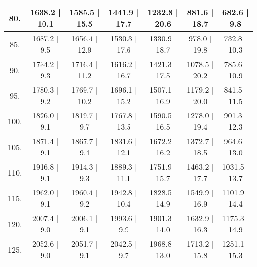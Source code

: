 \begin{tabular}{|c||c|c|c|c|c|c|}
\hline
  80. &   1638.2 |    10.1 &   1585.5 |    15.5 &   1441.9 |    17.7 &   1232.8 |    20.6 &    881.6 |    18.7 &    682.6 |     9.8\tabularnewline
\hline
  85. &   1687.2 |     9.5 &   1656.4 |    12.9 &   1530.3 |    17.6 &   1330.9 |    18.7 &    978.0 |    19.8 &    732.8 |    10.3\tabularnewline
\hline
  90. &   1734.2 |     9.3 &   1716.4 |    11.2 &   1616.2 |    16.7 &   1421.3 |    17.5 &   1078.5 |    20.2 &    785.6 |    10.9\tabularnewline
\hline
  95. &   1780.3 |     9.2 &   1769.7 |    10.2 &   1696.1 |    15.2 &   1507.1 |    16.9 &   1179.2 |    20.0 &    841.5 |    11.5\tabularnewline
\hline
 100. &   1826.0 |     9.1 &   1819.7 |     9.7 &   1767.8 |    13.5 &   1590.5 |    16.5 &   1278.0 |    19.4 &    901.3 |    12.3\tabularnewline
\hline
 105. &   1871.4 |     9.1 &   1867.7 |     9.4 &   1831.6 |    12.1 &   1672.2 |    16.2 &   1372.7 |    18.5 &    964.6 |    13.0\tabularnewline
\hline
 110. &   1916.8 |     9.1 &   1914.3 |     9.3 &   1889.3 |    11.1 &   1751.9 |    15.7 &   1463.2 |    17.7 &   1031.5 |    13.7\tabularnewline
\hline
 115. &   1962.0 |     9.1 &   1960.4 |     9.2 &   1942.8 |    10.4 &   1828.5 |    14.9 &   1549.9 |    16.9 &   1101.9 |    14.4\tabularnewline
\hline
 120. &   2007.4 |     9.0 &   2006.1 |     9.1 &   1993.6 |     9.9 &   1901.3 |    14.0 &   1632.9 |    16.3 &   1175.3 |    14.9\tabularnewline
\hline
 125. &   2052.6 |     9.0 &   2051.7 |     9.1 &   2042.5 |     9.7 &   1968.8 |    13.0 &   1713.2 |    15.8 &   1251.1 |    15.3\tabularnewline
\hline
\end{tabular}
